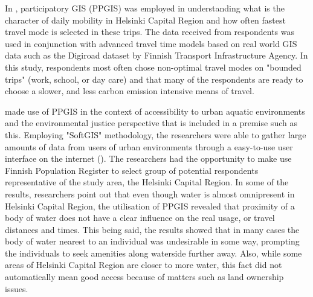 
In , participatory GIS (PPGIS) was employed in understanding what is the character of daily mobility in Helsinki Capital Region and how often fastest travel mode is selected in these trips. The data received from respondents was used in conjunction with advanced travel time models based on real world GIS data such as the Digiroad dataset by Finnish Transport Infrastructure Agency. In this study, respondents most often chose non-optimal travel modes on "bounded trips" (work, school, or day care) and that many of the respondents are ready to choose a slower, and less carbon emission intensive means of travel.

 made use of PPGIS in the context of accessibility to urban aquatic environments and the environmental justice perspective that is included in a premise such as this. Employing "SoftGIS" methodology, the researchers were able to gather large amounts of data from users of urban environments through a easy-to-use user interface on the internet (\cite{Kytta2011}). The researchers had the opportunity to make use Finnish Population Register to select group of potential respondents representative of the study area, the Helsinki Capital Region. In some of the results, researchers point out that even though water is almost omnipresent in Helsinki Capital Region, the utilisation of PPGIS revealed that proximity of a body of water does not have a clear influence on the real usage, or travel distances and times. This being said, the results showed that in many cases the body of water nearest to an individual was undesirable in some way, prompting the individuals to seek amenities along waterside further away. Also, while some areas of Helsinki Capital Region are closer to more water, this fact did not automatically mean good access because of matters such as land ownership issues.